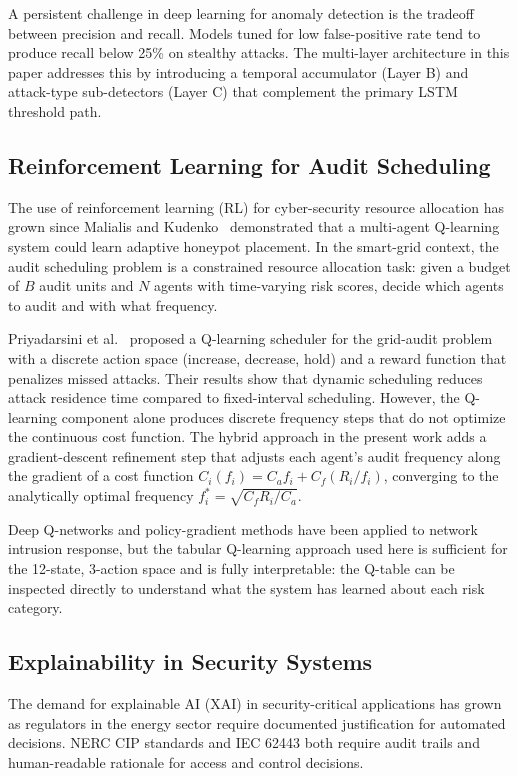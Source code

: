 A persistent challenge in deep learning for anomaly detection is the tradeoff between precision and
recall. Models tuned for low false-positive rate tend to produce recall below 25\% on stealthy
attacks. The multi-layer architecture in this paper addresses this by introducing a temporal
accumulator (Layer B) and attack-type sub-detectors (Layer C) that complement the primary LSTM
threshold path.

\subsection{Reinforcement Learning for Audit Scheduling}

The use of reinforcement learning (RL) for cyber-security resource allocation has grown since
Malialis and Kudenko~\cite{malialis2014} demonstrated that a multi-agent Q-learning system could
learn adaptive honeypot placement. In the smart-grid context, the audit scheduling problem is a
constrained resource allocation task: given a budget of $B$ audit units and $N$ agents with
time-varying risk scores, decide which agents to audit and with what frequency.

Priyadarsini et al.~\cite{priyadarsini2025} proposed a Q-learning scheduler for the grid-audit
problem with a discrete action space (increase, decrease, hold) and a reward function that penalizes
missed attacks. Their results show that dynamic scheduling reduces attack residence time compared to
fixed-interval scheduling. However, the Q-learning component alone produces discrete frequency steps
that do not optimize the continuous cost function. The hybrid approach in the present work adds a
gradient-descent refinement step that adjusts each agent's audit frequency along the gradient of a
cost function $C_i(f_i) = C_a f_i + C_f (R_i / f_i)$, converging to the analytically optimal
frequency $f_i^* = \sqrt{C_f R_i / C_a}$.

Deep Q-networks and policy-gradient methods have been applied to network intrusion response, but
the tabular Q-learning approach used here is sufficient for the 12-state, 3-action space and is
fully interpretable: the Q-table can be inspected directly to understand what the system has learned
about each risk category.

\subsection{Explainability in Security Systems}

The demand for explainable AI (XAI) in security-critical applications has grown as regulators in
the energy sector require documented justification for automated decisions. NERC CIP standards and
IEC 62443 both require audit trails and human-readable rationale for access and control decisions.

